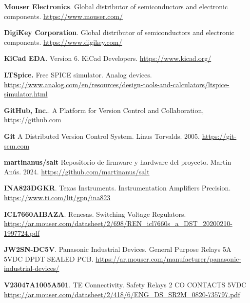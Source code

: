 \begin{thebibliography}{30}
\textbf{Mouser Electronics}.  Global distributor of semiconductors and electronic components. \href{https://www.mouser.com/}{https://www.mouser.com/}

\textbf{DigiKey Corporation}. Global distributor of semiconductors and electronic components. \href{https://www.digikey.com/}{https://www.digikey.com/}


\textbf{KiCad EDA}. Version 6. KiCad Developers.
\href{https://www.kicad.org/}{https://www.kicad.org/}


\textbf{LTSpice.} Free SPICE simulator. Analog devices.
\href{https://www.analog.com/en/resources/design-tools-and-calculators/ltspice-simulator.html}{https://www.analog.com/en/resources/design-tools-and-calculators/ltspice-simulator.html}


\textbf{GitHub, Inc.}. A Platform for Version Control and Collaboration,
\href{https://github.com}{https://github.com}


\textbf{Git} A Distributed Version Control System. Linus Torvalds. 2005.
\href{https://git-scm.com}{https://git-scm.com}


\textbf{martinanus/salt} Repositorio de firmware y hardware del proyecto. Martín Anús. 2024. \href{https://github.com/martinanus/salt}{https://github.com/martinanus/salt}



\textbf{INA823DGKR}. Texas Instruments. Instrumentation Amplifiers Precision. 
\href{https://www.ti.com/lit/gpn/ina823}{https://www.ti.com/lit/gpn/ina823}


\textbf{ICL7660AIBAZA}. Renesas. Switching Voltage Regulators. 
\href{https://ar.mouser.com/datasheet/2/698/REN_icl7660s_a_DST_20200210-1997724.pdf}{https://ar.mouser.com/datasheet/2/698/REN\_icl7660s\_a\_DST\_20200210-1997724.pdf}

\textbf{JW2SN-DC5V}. Panasonic Industrial Devices. General Purpose Relays 5A 5VDC DPDT SEALED PCB. 
\href{https://ar.mouser.com/manufacturer/panasonic-industrial-devices/}{https://ar.mouser.com/manufacturer/panasonic-industrial-devices/}


\textbf{V23047A1005A501}. TE Connectivity. Safety Relays 2 CO CONTACTS 5VDC
\href{https://ar.mouser.com/datasheet/2/418/6/ENG_DS_SR2M_0820-735797.pdf}{https://ar.mouser.com/datasheet/2/418/6/ENG\_DS\_SR2M\_0820-735797.pdf}


\end{thebibliography}
